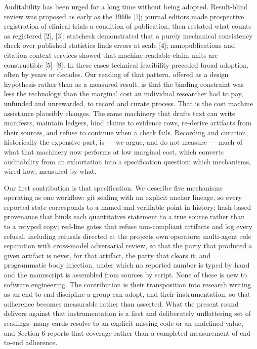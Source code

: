 \documentclass[
  english,
]{article}
\begin{document}
Auditability has been urged for a long time without being adopted. Result-blind review was proposed as early as the 1960s {[}1{]}; journal editors made prospective registration of clinical trials a condition of publication, then restated what counts as registered {[}2{]}, {[}3{]}; statcheck demonstrated that a purely mechanical consistency check over published statistics finds errors at scale {[}4{]}; nanopublications and citation-context services showed that machine-readable claim units are constructible {[}5{]}--{[}8{]}. In these cases technical feasibility preceded broad adoption, often by years or decades. Our reading of that pattern, offered as a design hypothesis rather than as a measured result, is that the binding constraint was less the technology than the marginal cost an individual researcher had to pay, unfunded and unrewarded, to record and curate process. That is the cost machine assistance plausibly changes. The same machinery that drafts text can write manifests, maintain ledgers, bind claims to evidence rows, re-derive artifacts from their sources, and refuse to continue when a check fails. Recording and curation, historically the expensive part, is --- we argue, and do not measure --- much of what that machinery now performs at low marginal cost, which converts auditability from an exhortation into a specification question: which mechanisms, wired how, measured by what.

Our first contribution is that specification. We describe five mechanisms operating as one workflow: git sealing with an explicit anchor lineage, so every reported state corresponds to a named and verifiable point in history; hash-based provenance that binds each quantitative statement to a true source rather than to a retyped copy; red-line gates that refuse non-compliant artifacts and log every refusal, including refusals directed at the project\textquotesingle s own operators; multi-agent role separation with cross-model adversarial review, so that the party that produced a given artifact is never, for that artifact, the party that clears it; and programmatic body injection, under which no reported number is typed by hand and the manuscript is assembled from sources by script. None of these is new to software engineering. The contribution is their transposition into research writing as an end-to-end discipline a group can adopt, and their instrumentation, so that adherence becomes measurable rather than asserted. What the present round delivers against that instrumentation is a first and deliberately unflattering set of readings: many cards resolve to an explicit missing code or an undefined value, and Section 6 reports that coverage rather than a completed measurement of end-to-end adherence.
\end{document}
